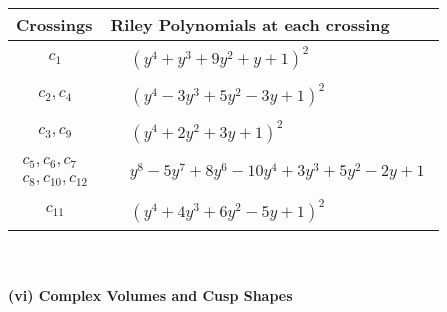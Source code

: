 \documentclass[1p]{elsarticle_modified}
\theoremstyle{definition}
\begin{document}
\begin{tabular}{m{50pt}|m{274pt}}
Crossings & \hspace{64pt}Riley Polynomials at each crossing \\
\hline $$\begin{aligned}c_{1}\end{aligned}$$&$\begin{aligned}
&(y^4+y^3+9 y^2+y+1)^2
\end{aligned}$\\
\hline $$\begin{aligned}c_{2},c_{4}\end{aligned}$$&$\begin{aligned}
&(y^4-3 y^3+5 y^2-3 y+1)^2
\end{aligned}$\\
\hline $$\begin{aligned}c_{3},c_{9}\end{aligned}$$&$\begin{aligned}
&(y^4+2 y^2+3 y+1)^2
\end{aligned}$\\
\hline $$\begin{aligned}c_{5},c_{6},c_{7}\\c_{8},c_{10},c_{12}\end{aligned}$$&$\begin{aligned}
&y^8-5 y^7+8 y^6-10 y^4+3 y^3+5 y^2-2 y+1
\end{aligned}$\\
\hline $$\begin{aligned}c_{11}\end{aligned}$$&$\begin{aligned}
&(y^4+4 y^3+6 y^2-5 y+1)^2
\end{aligned}$\\
\hline
\end{tabular}\\~\\
\newpage\flushleft \textbf{(vi) Complex Volumes and Cusp Shapes}
\end{document}
